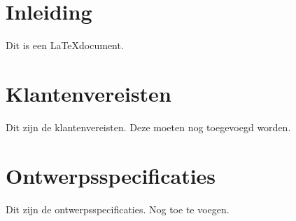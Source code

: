 \documentclass{article}
\begin{document}
\section{Inleiding}

Dit is een \LaTeX document.

\section{Klantenvereisten}

Dit zijn de klantenvereisten.
Deze moeten nog toegevoegd worden.

\section{Ontwerpsspecificaties}

Dit zijn de ontwerpsspecificaties.
Nog toe te voegen.
\end{document}
